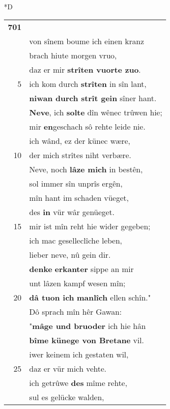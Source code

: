 \documentclass[8pt,a4paper,notitlepage]{article}
\begin{document}
\begin{table}[ht]
\begin{minipage}[t]{0.5\linewidth}
\small
\begin{center}*D
\end{center}
\begin{tabular}{rl}
\textbf{701} & \textit{\begin{large}D\end{large}}er dâ heizet \textbf{künec} Gramoflanz.\\ 
 & von sînem boume ich einen kranz\\ 
 & brach hiute morgen vruo,\\ 
 & daz er mir \textbf{strîten vuorte zuo}.\\ 
5 & ich kom durch \textbf{strîten} in sîn lant,\\ 
 & \textbf{niwan durch strît gein} sîner hant.\\ 
 & \textbf{Neve}, ich \textbf{solte} dîn wênec trûwen hie;\\ 
 & mir \textbf{en}geschach sô rehte leide nie.\\ 
 & ich wând, ez der künec wære,\\ 
10 & der mich strîtes niht verbære.\\ 
 & Neve, noch \textbf{lâze mich} in bestên,\\ 
 & sol immer sîn unprîs ergên,\\ 
 & mîn hant im schaden vüeget,\\ 
 & des \textbf{in} vür wâr genüeget.\\ 
15 & mir ist mîn reht hie wider gegeben;\\ 
 & ich mac geselleclîche leben,\\ 
 & lieber neve, nû gein dir.\\ 
 & \textbf{denke} \textbf{erkanter} sippe an mir\\ 
 & unt lâzen kampf wesen mîn;\\ 
20 & \textbf{dâ tuon ich} \textbf{manlîch} ellen schîn."\\ 
 & Dô sprach mîn hêr Gawan:\\ 
 & "\textbf{mâge und bruoder} ich hie hân\\ 
 & \textbf{bîme künege von Bretane} vil.\\ 
 & iwer keinem ich gestaten wil,\\ 
25 & daz er vür mich vehte.\\ 
 & ich getrûwe \textbf{des} mîme rehte,\\ 
 & sul es gelücke walden,\\ 

\end{tabular}
\end{minipage}
\end{table}
\end{document}
